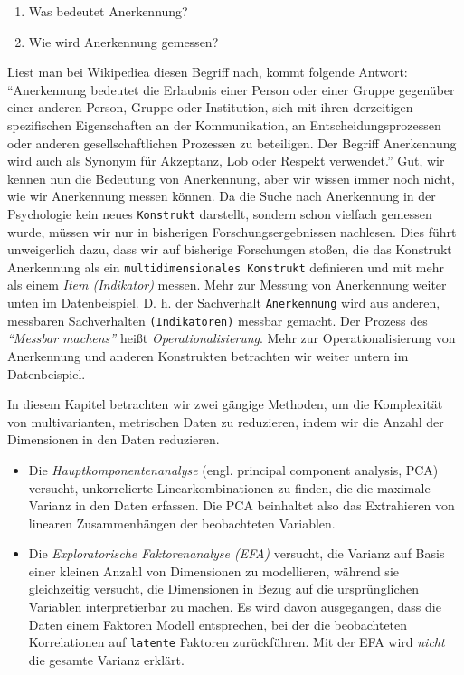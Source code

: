 \documentclass[12pt,ngerman,]{book}
\providecommand{\tightlist}{%
  \setlength{\itemsep}{0pt}\setlength{\parskip}{0pt}}
\begin{document}
\begin{enumerate}
\def\labelenumi{\arabic{enumi}.}
\tightlist
\item
  Was bedeutet Anerkennung?
\item
  Wie wird Anerkennung gemessen?
\end{enumerate}

Liest man bei Wikipediea diesen Begriff nach, kommt folgende Antwort:
``Anerkennung bedeutet die Erlaubnis einer Person oder einer Gruppe
gegenüber einer anderen Person, Gruppe oder Institution, sich mit ihren
derzeitigen spezifischen Eigenschaften an der Kommunikation, an
Entscheidungsprozessen oder anderen gesellschaftlichen Prozessen zu
beteiligen. Der Begriff Anerkennung wird auch als Synonym für Akzeptanz,
Lob oder Respekt verwendet.'' Gut, wir kennen nun die Bedeutung von
Anerkennung, aber wir wissen immer noch nicht, wie wir Anerkennung
messen können. Da die Suche nach Anerkennung in der Psychologie kein
neues \texttt{Konstrukt} darstellt, sondern schon vielfach gemessen
wurde, müssen wir nur in bisherigen Forschungsergebnissen nachlesen.
Dies führt unweigerlich dazu, dass wir auf bisherige Forschungen stoßen,
die das Konstrukt Anerkennung als ein
\texttt{multidimensionales\ Konstrukt} definieren und mit mehr als einem
\emph{Item (Indikator)} messen. Mehr zur Messung von
Anerkennung weiter unten im Datenbeispiel. D. h. der Sachverhalt
\texttt{Anerkennung} wird aus anderen, messbaren Sachverhalten
\texttt{(Indikatoren)} messbar gemacht. Der Prozess des \emph{``Messbar
machens''} heißt \emph{Operationalisierung}.
Mehr zur Operationalisierung von Anerkennung und anderen Konstrukten
betrachten wir weiter untern im Datenbeispiel.

In diesem Kapitel betrachten wir zwei gängige Methoden, um die
Komplexität von multivarianten, metrischen Daten zu reduzieren, indem
wir die Anzahl der Dimensionen in den Daten reduzieren.

\begin{itemize}
\tightlist
\item
  Die \emph{Hauptkomponentenanalyse}
  (engl. principal component analysis, PCA) versucht, unkorrelierte
  Linearkombinationen zu finden, die die maximale Varianz in den Daten
  erfassen. Die PCA beinhaltet also das Extrahieren von
  linearen Zusammenhängen der beobachteten Variablen.
\item
  Die \emph{Exploratorische Faktorenanalyse
  (EFA)} versucht, die Varianz
  auf Basis einer kleinen Anzahl von Dimensionen zu modellieren, während
  sie gleichzeitig versucht, die Dimensionen in Bezug auf die
  ursprünglichen Variablen interpretierbar zu machen. Es wird davon
  ausgegangen, dass die Daten einem Faktoren Modell entsprechen, bei der
  die beobachteten Korrelationen auf \texttt{latente} Faktoren
  zurückführen. Mit der EFA wird \emph{nicht} die gesamte Varianz
  erklärt.
\end{itemize}
\end{document}
